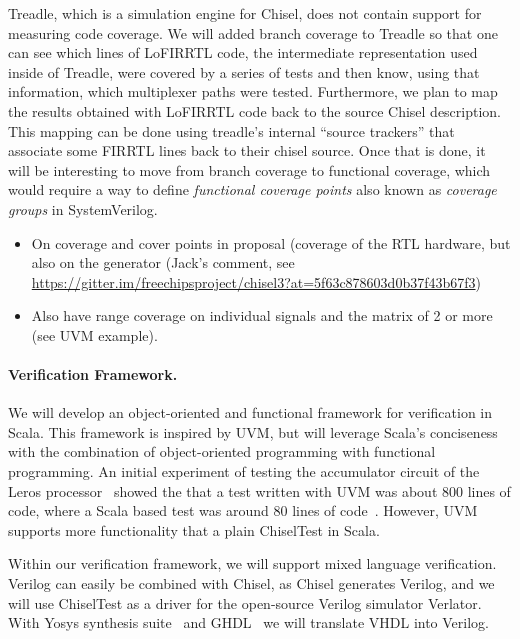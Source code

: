 \documentclass[conference]{IEEEtran}
\begin{document}
Treadle, which is a simulation engine for Chisel, does not contain support for measuring code coverage.
We will added branch coverage to Treadle so that one can see which lines of
LoFIRRTL code, the intermediate representation used inside of Treadle, were covered by a series of tests
and then know, using that information, which multiplexer paths were tested. 
Furthermore, we plan to map the results obtained with LoFIRRTL code back to the source Chisel description.
This mapping can be done using treadle's internal ``source trackers'' that associate some FIRRTL lines back
to their chisel source. Once that is done, it will be interesting to move from branch coverage to functional
coverage, which would require a way to define \textit{functional coverage points} also known as
\textit{coverage groups} in SystemVerilog.

\begin{itemize}
\item On coverage and cover points in proposal (coverage of the RTL hardware, but also on the generator (Jack's comment, see \url{https://gitter.im/freechipsproject/chisel3?at=5f63c878603d0b37f43b67f3})
\item Also have range coverage on individual signals and the matrix of 2 or more (see UVM example).
\end{itemize}



\paragraph{Verification Framework.} %

We will develop an object-oriented and functional framework for verification in Scala.
This framework is inspired by UVM, but will leverage Scala's conciseness with the
combination of object-oriented programming with functional programming.
An initial experiment of testing the accumulator circuit of the Leros processor~\cite{leros:arcs2019}
showed the that a test written with UVM was about 800 lines of code, where a Scala based
test was around 80 lines of code~\cite{verify:chisel:2020}.
However, UVM supports more functionality that a plain ChiselTest in Scala.

Within our verification framework, we will support mixed language verification.
Verilog can easily be combined with Chisel, as Chisel generates Verilog, and
we will use ChiselTest as a driver for the open-source Verilog simulator Verlator.
With Yosys synthesis suite~\cite{Yosys} and GHDL~\cite{ghdl}
we will translate VHDL into Verilog.
\end{document}
